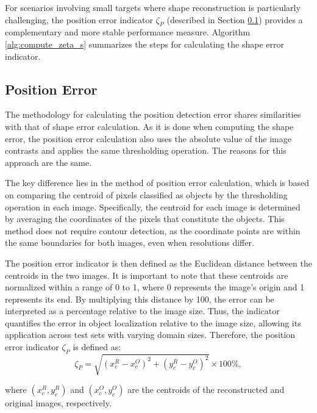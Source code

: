 \documentclass{ieeeaccess}
\begin{document}
        For scenarios involving small targets where shape reconstruction is particularly challenging, the position error indicator $\zeta_P$ (described in Section \ref{sec:indicators:positionerror}) provides a complementary and more stable performance measure. Algorithm \ref{alg:compute_zeta_s} summarizes the steps for calculating the shape error indicator.

        

    \subsection{Position Error}\label{sec:indicators:positionerror}

        The methodology for calculating the position detection error shares similarities with that of shape error calculation. As it is done when computing the shape error, the position error calculation also uses the absolute value of the image contrasts and applies the same thresholding operation. The reasons for this approach are the same.

        The key difference lies in the method of position error calculation, which is based on comparing the centroid of pixels classified as objects by the thresholding operation in each image. Specifically, the centroid for each image is determined by averaging the coordinates of the pixels that constitute the objects. This method does not require contour detection, as the coordinate points are within the same boundaries for both images, even when resolutions differ.

        The position error indicator is then defined as the Euclidean distance between the centroids in the two images. It is important to note that these centroids are normalized within a range of 0 to 1, where 0 represents the image's origin and 1 represents its end. By multiplying this distance by 100, the error can be interpreted as a percentage relative to the image size. Thus, the indicator quantifies the error in object localization relative to the image size, allowing its application across test sets with varying domain sizes. Therefore, the position error indicator $\zeta_P$ is defined as:
        \begin{equation}
            \zeta_P = \sqrt{(x_c^R - x_c^O)^2 + (y_c^R-y_c^O)^2} \times 100\%, \label{eq:positionerror}
        \end{equation}

        \noindent where $(x_c^R, y_c^R)$ and $(x_c^O, y_c^O)$ are the centroids of the reconstructed and original images, respectively.
\end{document}
